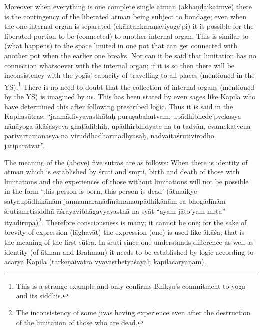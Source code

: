 



\eject

Moreover when everything is one complete single ātman (akhaṇḍaikātmye) there is the contingency of the liberated ātman being subject to bondage; even when the one internal organ is separated (ekāntaḥkara\-ṇaviyoge’pi) it is possible for the liberated portion to be (connected) to another internal organ. This is similar to (what happens) to the space limited in one pot that can get connected with another pot when the earlier one breaks. Nor can it be said that limitation has no connection whatsoever with the internal organ; if it is so then there will be inconsistency with the yogīs’ capacity of travelling to all places (mentioned in the YS).\footnote{This is a strange example and only confirms Bhikṣu’s commitment to yoga and its siddhis.} There is no need to doubt that the collection of internal organs (mentioned by the YS)  is imagined by us. This has been stated by even sages like Kapila who have determined this after following prescribed logic. Thus it is said in the Kapilasūtras: “janmādivyavasthātaḥ puruṣabahutvam, upādhibhede’pyekasya nānāyoga ākāśasyeva ghaṭā\-dibhiḥ, upādhirbhidyate na tu tadvān, evamekatvena parivartamāna\-sya na viruddhadharmādhyāsaḥ, nādvaitaśrutivirodho jātiparatvāt”. 

The meaning of the (above) five sūtras are as follows: When there is identity of ātman   which is established by śruti and smṛti, birth and death of those with limitations and the experiences of those without limitations will not be possible in the form ‘this person is born, this person is dead’ (ātmaikye satyaupādhikānām janmamaraṇādīnāmana\-upādhikānām ca bhogādīnām śrutismṛtisiddhā āśrayavibhāgavyava\-sthā na syāt “ayam jāto’yam mṛta” ityādirupā)\footnote{The inconsistency of some jīvas having experience even after the destruction of the limitation of those who are dead.}. Therefore consciousness is many; it cannot be one; for the sake of brevity of expression (lāghavāt) the expression (one) is used like ākāśa; that is the meaning of the first sūtra. In śruti since one understands difference as well as identity (of ātman and Brahman) it needs to be established by logic according to ācārya Kapila (tarkeṇaivātra vyavasthetyāśayaḥ kapilācāryāṇām).

